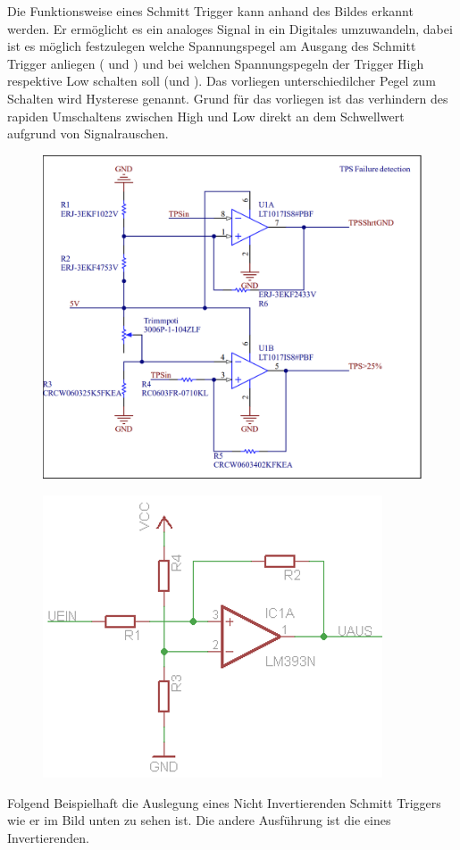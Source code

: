 Die Funktionsweise eines Schmitt Trigger kann anhand des Bildes erkannt werden. Er ermöglicht es ein analoges Signal in ein Digitales umzuwandeln, dabei ist es möglich festzulegen welche Spannungspegel am Ausgang des Schmitt Trigger anliegen ( und ) und bei welchen Spannungspegeln der Trigger High respektive Low schalten soll (und ). Das vorliegen unterschiedilcher Pegel zum Schalten wird Hysterese genannt. Grund für das vorliegen ist das verhindern des rapiden Umschaltens zwischen High und Low direkt an dem Schwellwert aufgrund von Signalrauschen.

\begin{figure}
	\centering
	\includegraphics[width=0.7\linewidth]{"bilder/TPS Failure detection"}
	\caption{}
	\label{fig:tps-failure-detection}
\end{figure}

\begin{figure}
	\centering
	\includegraphics[width=0.5\linewidth]{"bilder/nichtinvertierender Trigger"}
	\caption{}
	\label{fig:nichtinvertierender-trigger}
\end{figure}

Folgend Beispielhaft die Auslegung eines Nicht Invertierenden Schmitt Triggers wie er im Bild unten zu sehen ist. Die andere Ausführung ist die eines Invertierenden.

